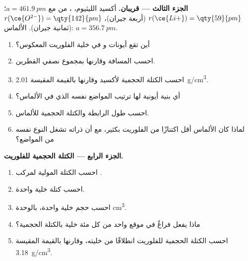 \begin{problem}
\medskip
\noindent\textbf{الجزء الثالث --- قريبان.}
أكسيد الليثيوم، ، من  مع $a = \qty{461.9}{pm}$؛
$r(\ce{Li+}) = \qty{59}{pm}$ (أربعة جيران)، $r(\ce{O^{2-}}) =
\qty{142}{pm}$ (ثمانية جيران). الألماس: $a = \qty{356.7}{pm}$.
\begin{enumerate}[resume]
  \item أين تقع أيونات  و في خلية الفلوريت
        المعكوس؟
  \item احسب المسافة  وقارنها بمجموع نصفي
        القطرين.
  \item احسب الكتلة الحجمية لأكسيد  وقارنها بالقيمة المقيسة
        \qty{2.01}{g/cm^3}.
  \item أي بنية أيونية لها ترتيب المواضع نفسه الذي في
        الألماس؟
  \item احسب طول الرابطة  والكتلة الحجمية للألماس.
  \item لماذا كان الألماس أقل اكتنازًا من الفلوريت بكثير، مع أن
        ذراته تشغل النوع نفسه من المواضع؟
\end{enumerate}

\medskip
\noindent\textbf{الجزء الرابع --- الكتلة الحجمية للفلوريت.}
\begin{enumerate}[resume]
  \item احسب الكتلة المولية لمركب .
  \item احسب كتلة خلية واحدة.
  \item احسب حجم خلية واحدة، بالوحدة \unit{cm^3}.
  \item ماذا يفعل فراغٌ في موقع  واحد من كل مئة خلية
        بالكتلة الحجمية؟
  \item احسب الكتلة الحجمية للفلوريت انطلاقًا من خليته، وقارنها
        بالقيمة المقيسة \qty{3.18}{g/cm^3}.
\end{enumerate}
\end{problem}
